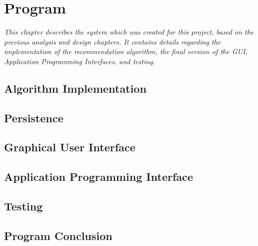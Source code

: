 \chapter{Program}

\textit{This chapter describes the system which was created for this project, based on the previous analysis and design chapters. It contains details regarding the implementation of the recommendation algorithm, the final version of the GUI, Application Programming Interfaces, and testing.}

\section{Algorithm Implementation}
\label{AlgorithmProg}

\section{Persistence}
\label{Persistence}

\section{Graphical User Interface}
\label{GUI}

\section{Application Programming Interface}
\label{API}

\section{Testing}
\label{Testing}

\section{Program Conclusion}
\label{ProCon}
